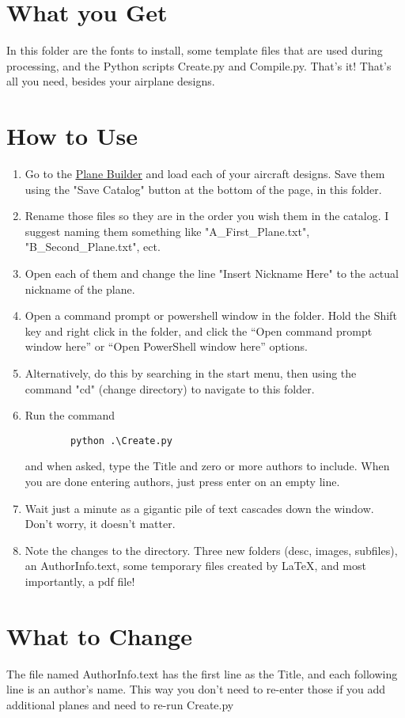 \documentclass{article}
\begin{document}
\section{What you Get}
In this folder are the fonts to install, some template files that are used during processing, and the Python scripts Create.py and Compile.py.  That's it!  That's all you need, besides your airplane designs.
\section{How to Use}
\begin{enumerate}
        \item Go to the \href{https://tetragramm.github.io/PlaneBuilder/index.html}{\color{blue}\underline{Plane Builder}} and load each of your aircraft designs.  Save them using the "Save Catalog" button at the bottom of the page, in this folder.
        \item Rename those files so they are in the order you wish them in the catalog.  I suggest naming them something like "A\_First\_Plane.txt", "B\_Second\_Plane.txt", ect.
        \item Open each of them and change the line "Insert Nickname Here" to the actual nickname of the plane.
        \item Open a command prompt or powershell window in the folder.  Hold the Shift key and right click in the folder, and click the ``Open command prompt window here'' or ``Open PowerShell window here'' options.
        \item Alternatively, do this by searching in the start menu, then using the command "cd" (change directory) to navigate to this folder.
        \item Run the command \begin{verbatim}
        python .\Create.py
    \end{verbatim} and when asked, type the Title and zero or more authors to include. When you are done entering authors, just press enter on an empty line.
        \item Wait just a minute as a gigantic pile of text cascades down the window.  Don't worry, it doesn't matter.
        \item Note the changes to the directory.  Three new folders (desc, images, subfiles), an AuthorInfo.text, some temporary files created by \LaTeX, and most importantly, a pdf file!
\end{enumerate}

\section{What to Change}
The file named AuthorInfo.text has the first line as the Title, and each following line is an author's name.  This way you don't need to re-enter those if you add additional planes and need to re-run Create.py
\end{document}
